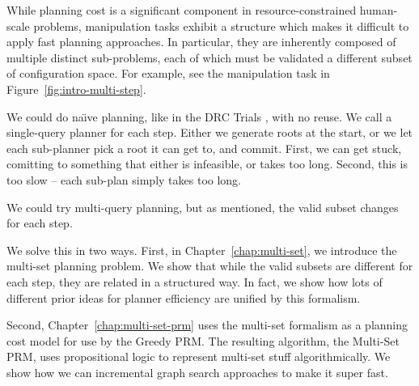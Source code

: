 While planning cost is a significant component
in resource-constrained human-scale problems,
manipulation tasks exhibit a structure
which makes it difficult to apply fast planning approaches.
In particular,
they are inherently composed of multiple distinct sub-problems,
each of which 
must be validated a different subset of configuration space.
For example, see the manipulation task in
Figure~\ref{fig:intro-multi-step}.

We could do na\"{\i}ve planning, like in the
DRC Trials \cite{dellin2014drc},
with no reuse.
We call a single-query planner for each step.
Either we generate roots at the start,
or we let each sub-planner pick a root it can get to, and commit.
First, we can get stuck,
comitting to something that either is infeasible, or takes too long.
Second, this is too slow --
each sub-plan simply takes too long.

We could try multi-query planning,
but as mentioned,
the valid subset changes for each step.

We solve this in two ways.
First, in Chapter~\ref{chap:multi-set},
we introduce the multi-set planning problem.
We show that while the valid subsets are different for each step,
they are related in a structured way.
In fact, we show how lots of different prior ideas for planner
efficiency are unified by this formalism.

Second, Chapter~\ref{chap:multi-set-prm}
uses the multi-set formalism as a planning cost model
for use by the Greedy PRM.
The resulting algorithm,
the Multi-Set PRM,
uses propositional logic to represent multi-set stuff
algorithmically.
We show how we can incremental graph search approaches
to make it super fast.

